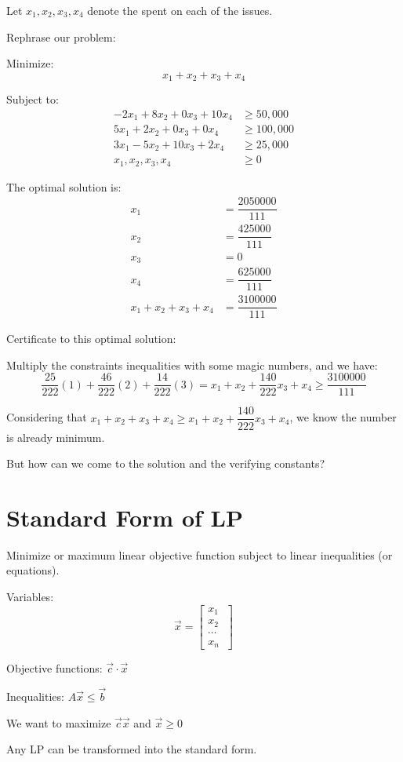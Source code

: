 Let \(x_1, x_2, x_3, x_4\) denote the spent on each of the issues. 

Rephrase our problem:

Minimize:
\[
    x_1 + x_2 + x_3 + x_4
\]

Subject to:
\begin{align*}
    -2x_1 + 8x_2 + 0x_3 + 10x_4 &\geq 50,000 \tag{Urban Majority  (1)} \\
    5x_1 + 2x_2 + 0x_3 + 0x_4 &\geq 100,000 \tag{Suburban Majority (2)}  \\
    3x_1 - 5x_2 + 10x_3 + 2x_4 &\geq 25,000 \tag{Rural Majority (3)} \\
    x_1, x_2, x_3, x_4 &\geq 0 \tag{Can't unadvertise}
\end{align*}

The optimal solution is:
\begin{align}
    x_1 &= \dfrac{2050000}{111} \\
    x_2 &= \dfrac{425000}{111} \\
    x_3 &= 0 \\
    x_4 &= \dfrac{625000}{111} \\ 
    x_1 + x_2 + x_3 + x_4 &= \dfrac{3100000}{111}
\end{align}

Certificate to this optimal solution:

Multiply the constraints inequalities with some magic numbers, and we have:
\[
    \dfrac{25}{222} (1) + \dfrac{46}{222} (2) + \dfrac{14}{222} (3) 
    =
    x_1 + x_2 + \dfrac{140}{222} x_3 + x_4
    \geq
    \dfrac{3100000}{111}
\]

Considering that \(x_1 + x_2 + x_3 + x_4 \geq x_1 + x_2 + \dfrac{140}{222} x_3 + x_4\), we know the number is already minimum. 

But how can we come to the solution and the verifying constants?

\section{Standard Form of LP}
\begin{definition}
    Minimize or maximum linear objective function subject to linear inequalities (or equations).

    Variables:
    \[
        \vec{x} = \begin{bmatrix}
             x_1 \\
             x_2 \\
             \cdots \\
             x_n \
        \end{bmatrix}
    \]

    Objective functions: \(\vec{c}  \cdot \vec{x} \) 

    Inequalities: \(A \vec{x} \leq \vec{b}\) 

    We want to maximize \(\vec{c} \vec{x} \) and \(\vec{x} \geq 0\)  
    \begin{remark}
        Any LP can be transformed into the standard form.
    \end{remark}
\end{definition}

